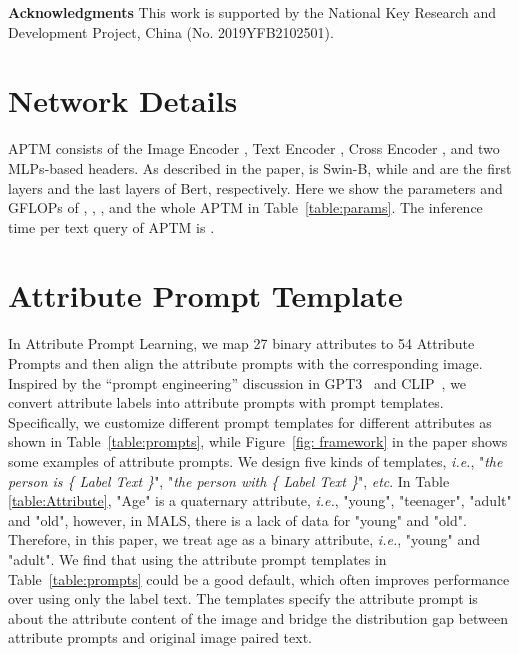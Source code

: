 \documentclass[sigconf]{acmart}
\def\ie{\emph{i.e.}}
\begin{document}
\noindent\textbf{Acknowledgments}
This work is supported by the National Key Research and Development Project, China (No. 2019YFB2102501).


  \newcommand{\gain}[1]{\textcolor{gain}{#1}}
  \newcommand{\lost}[1]{\textcolor{lost}{#1}}
\newcommand{\res}[2]{{#1} {({\gain{#2}})}}

{\small


}


\clearpage
\appendix
{}


\section{Network Details}
APTM consists of the Image Encoder , Text Encoder , Cross Encoder , and two MLPs-based headers. As described in the paper,  is Swin-B, while  and  are the first  layers and the last  layers of Bert, respectively. Here we show the parameters and GFLOPs of , , , and the whole APTM in Table~\ref{table:params}. 
The inference time per text query of APTM is .


\section{Attribute Prompt Template}
In Attribute Prompt Learning, we map 27 binary attributes to 54 Attribute Prompts and then align the attribute prompts with the corresponding image. 
Inspired by the “prompt engineering” discussion in GPT3~\cite{brown2020GPT3, gao2020making} and CLIP~\cite{radford2021CLIP}, we convert attribute labels into attribute prompts with prompt templates.
Specifically, we customize different prompt templates for different attributes as shown in Table~\ref{table:prompts}, while Figure~\ref{fig: framework} in the paper shows some examples of attribute prompts. 
We design five kinds of templates, \ie, "\textit{the person is \{ Label Text \}}", "\textit{the person with \{ Label Text \}}", \emph{etc}.
In Table \ref{table:Attribute}, "Age" is a quaternary attribute, \ie, "young", "teenager", "adult" and "old", however, in MALS, there is a lack of data for "young" and "old". Therefore, in this paper, we treat age as a binary attribute, \ie, "young" and "adult".
We find that using the attribute prompt templates in Table~\ref{table:prompts} could be a good default, which often improves performance over using only the label text. 
The templates specify the attribute prompt is about the attribute content of the image and bridge the distribution gap between attribute prompts and original image paired text.
\end{document}
